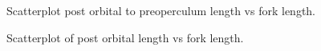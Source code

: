 \documentclass[12pt]{article}\usepackage[]{graphicx}\usepackage[]{color}
\begin{document}
\begin{figure}[htb]

{\centering {} 

}

\caption{Scatterplot post orbital to preoperculum length vs fork length.}\label{fig:figure7}
\end{figure}

\begin{figure}[htb]

{\centering {} 

}

\caption{Scatterplot of post orbital length vs fork length.}\label{fig:figure8}
\end{figure}
\clearpage
\end{document}

